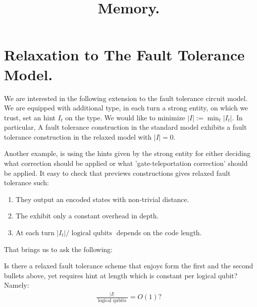 \documentclass[manuscript,screen,review]{acmart}
\begin{document}

\title{ Memory. }
\maketitle

\newcommand*{\Mbas}{\mathcal{X}^\prime}
\newcommand*{\bas}{\mathcal{X}}
\newcommand*{\sMbas}{\Mbas}
\newcommand*{\QQ}{C_{X}/C_{Z}^\perp }
\newcommand*{\trig}{ Triorthogonal }
\newcommand*{\Hyp}{ Hyperproduct }
\newcommand*{\Cin}{ C_{\text{initial}} }
\newcommand*{\Ctan}{ C_{\text{Tan}} }



\newcommand*{\QACze}{\mathbf{QAC}_{0}}
\newcommand*{\QNCzef}{\mathbf{QNC}_{0,f}}
\newcommand*{\QNCze}{\mathbf{QNC}_{0}}
\newcommand*{\QNCon}{\mathbf{QNC}_{1}}
\newcommand*{\NCon}{\mathbf{NC}_{1}}
\newcommand*{\noiseQNCon}{noisy-$\QNCon$}
\newcommand*{\QNC}{\mathbf{QNC}}
\newcommand*{\QNCG}{\mathbf{QNC_G}}
\newcommand*{\NC}{\mathbf{NC}}
\newcommand*{\QNCiG}{\mathbf{QNC_{G,i}}}


\newcommand*{\CDO} {CDFT} 

\section{Relaxation to The Fault Tolerance Model.} We are interested in the following extension to the fault tolerance circuit model. We are equipped with additional type, in each turn a strong entity, on which we trust, set an hint $I_{t}$ on the type. We would like to minimize $|I| := \min_{t} |I_{t}|$. In particular, A fault tolerance construction in the standard model exhibits a fault tolerance construction in the relaxed model with $|I| = 0$.      

Another example, is using the hints given by the strong entity for either  deciding what correction should be applied or what 'gate-teleportation correction' should be applied. It easy to check that previews constructions  gives relaxed fault tolerance such:     
\begin{enumerate}
  \item They output an encoded states with non-trivial distance. 
  \item The exhibit only a constant overhead in depth. 
  \item At each turn $|I_{t}| / \text{ logical qubits } $ depends on the code length.  
\end{enumerate}
That brings us to ask the following:
\begin{oproblem}
  Is there a relaxed fault tolerance scheme that enjoys form the first and the second bullets above, yet requires hint at length which is constant per logical qubit? Namely:   
  \begin{equation*}
    \begin{split}
      \frac{ |I| } { \text{ logical qubits } } = O(1) ? 
    \end{split}
  \end{equation*}
\end{oproblem}
\end{document}

